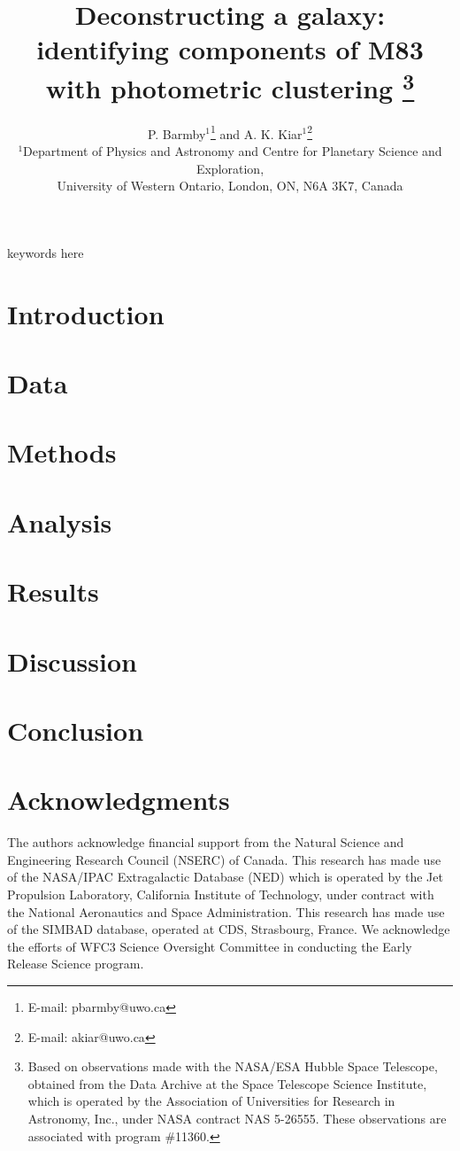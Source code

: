 \documentclass[useAMS,usenatbib]{mn2e}
\title[Deconstructing M83]{Deconstructing a galaxy: identifying components of M83 with photometric clustering%
\footnote{  
Based on observations made with the NASA/ESA Hubble Space Telescope, obtained from the Data Archive at the Space Telescope Science Institute, which is operated by the Association of Universities for Research in Astronomy, Inc., under NASA contract NAS 5-26555. These observations are associated with program \#11360.
}
}
\author[Kiar \& Barmby \& Kiar]
{
P. Barmby$^{1}$\thanks{E-mail: pbarmby@uwo.ca} and 
A. K. Kiar$^{1}$\thanks{E-mail: akiar@uwo.ca}\\
$^{1}$Department of Physics and Astronomy and Centre for Planetary Science and Exploration,\\
University of Western Ontario, London, ON, N6A 3K7, Canada\\
}
\begin{document}
\date{}


\maketitle
\label{firstpage}

\begin{abstract}

\end{abstract}

\begin{keywords}
keywords here
\end{keywords}

\section{Introduction}

\section{Data}

\section{Methods}

\section{Analysis}

\section{Results}

\section{Discussion}

\section{Conclusion}



\section*{Acknowledgments}

The authors acknowledge financial support from the Natural Science and Engineering Research Council (NSERC) of Canada.
This research has made use of the NASA/IPAC Extragalactic Database (NED) which is operated by the Jet Propulsion Laboratory,
California Institute of Technology, under contract with the National Aeronautics and Space Administration. 
This research has made use of the SIMBAD database, operated at CDS, Strasbourg, France.
We acknowledge the efforts of WFC3 Science Oversight Committee in conducting the Early Release Science program.


{}

\bsp



\appendix

\label{lastpage}
\end{document}
